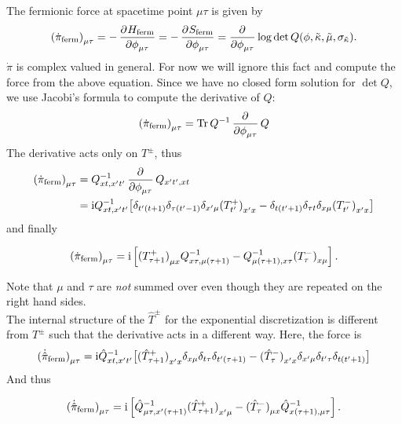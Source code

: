 \documentclass[a4paper, fleqn, twoside, notitlepage]{scrartcl}
\begin{document}
The fermionic force at spacetime point $\mu\tau$ is given by
\begin{align}
  {(\dot{\pi}_{\text{ferm}})}_{\mu\tau} = -\dpd{H_{\text{ferm}}}{\phi_{\mu\tau}} = -\dpd{S_\text{ferm}}{\phi_{\mu\tau}} =  \dpd{}{\phi_{\mu\tau}} \log \det Q(\phi, \tilde{\kappa}, \tilde{\mu}, \sigma_{\tilde{\kappa}}).
\end{align}
$\dot{\pi}$ is complex valued in general. For now we will ignore this fact and compute the force from the above equation.
Since we have no closed form solution for $\det Q$, we use Jacobi's formula to compute the derivative of $Q$:
\begin{align}
  {(\dot{\pi}_{\text{ferm}})}_{\mu\tau} = \Tr Q^{-1} \dpd{}{\phi_{\mu\tau}} Q
\end{align}
The derivative acts only on $T^\pm$, thus
\begin{align}
  {(\dot{\pi}_{\text{ferm}})}_{\mu\tau}
  &= Q^{-1}_{xt,x't'} \dpd{}{\phi_{\mu\tau}} Q_{x't',xt}\\
  &= \i Q^{-1}_{xt,x't'} \big[\delta_{t'(t+1)}\delta_{\tau(t'-1)}\delta_{x'\mu}  {(T^+_{t'})}_{x'x} - \delta_{t(t'+1)}\delta_{\tau t}\delta_{x\mu} {(T^-_{t'})}_{x'x}\big]
\end{align}
and finally
\begin{resultbox}
  \vspace{-\baselineskip}
  \begin{align}
    {(\dot{\pi}_{\text{ferm}})}_{\mu\tau} = \mathrm{i} \left[{(T^+_{\tau+1})}_{\mu x}Q^{-1}_{x\tau,\mu(\tau+1)} - Q^{-1}_{\mu(\tau+1),x\tau}{(T^-_\tau)}_{x\mu}\right].
  \end{align}
\end{resultbox}
\noindent
Note that $\mu$ and $\tau$ are \emph{not} summed over even though they are repeated on the right hand sides.\\

\noindent
The internal structure of the $\hat{T}^{\pm}$ for the exponential discretization is different from $T^\pm$ such that the derivative acts in a different way.
Here, the force is
\begin{align}
  {(\dot{\hat{\pi}}_{\text{ferm}})}_{\mu\tau} = \mathrm{i} \hat{Q}^{-1}_{xt,x't'} \big[{(\hat{T}^+_{\tau+1})}_{x'x} \delta_{x\mu} \delta_{t\tau} \delta_{t'(\tau+1)} - {(\hat{T}^-_\tau)}_{x'x} \delta_{x'\mu} \delta_{t'\tau} \delta_{t(t'+1)}\big]
\end{align}
And thus
\begin{resultbox}
  \vspace{-\baselineskip}
  \begin{align}
    {(\dot{\hat{\pi}}_{\text{ferm}})}_{\mu\tau} = \mathrm{i} \left[\hat{Q}^{-1}_{\mu\tau,x'(\tau+1)} {(\hat{T}^+_{\tau+1})}_{x'\mu} - {(\hat{T}^-_\tau)}_{\mu x} \hat{Q}^{-1}_{x(\tau+1),\mu\tau}\right].
  \end{align}
\end{resultbox}
\end{document}
